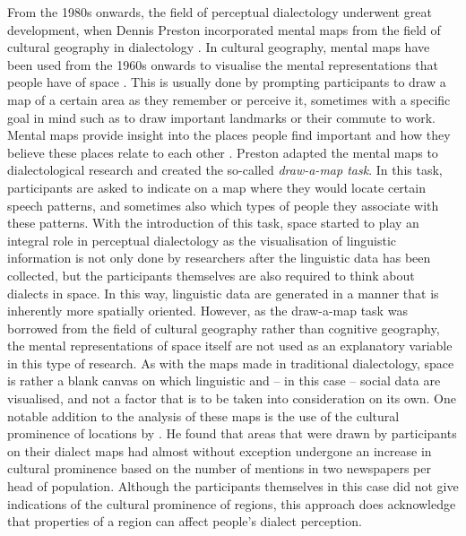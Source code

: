 \documentclass[output=paper,colorlinks,citecolor=brown,draft]{langscibook}
\begin{document}
From the 1980s onwards, the field of perceptual dialectology underwent great development, when Dennis Preston incorporated mental maps from the field of cultural geography in dialectology \citep{montgomery_perceptual_2011, preston_perceptual_1981}. In cultural geography, mental maps have been used from the 1960s onwards to visualise the mental representations that people have of space \citep{lynch_image_1964, portugali_history_2018}. This is usually done by prompting participants to draw a map of a certain area as they remember or perceive it, sometimes with a specific goal in mind such as to draw important landmarks or their commute to work. Mental maps provide insight into the places people find important and how they believe these places relate to each other \citep{gould_mental_1974}. Preston adapted the mental maps to dialectological research and created the so-called \textit{draw-a-map task}. In this task, participants are asked to indicate on a map where they would locate certain speech patterns, and sometimes also which types of people they associate with these patterns. With the introduction of this task, space started to play an integral role in perceptual dialectology as the visualisation of linguistic information is not only done by researchers after the linguistic data has been collected, but the participants themselves are also required to think about dialects in space. In this way, linguistic data are generated in a manner that is inherently more spatially oriented. However, as the draw-a-map task was borrowed from the field of cultural geography rather than cognitive geography, the mental representations of space itself are not used as an explanatory variable in this type of research. As with the maps made in traditional dialectology, space is rather a blank canvas on which linguistic and -- in this case -- social data are visualised, and not a factor that is to be taken into consideration on its own. One notable addition to the analysis of these maps is the use of the cultural prominence of locations by \citet{montgomery_effect_2012}. He found that areas that were drawn by participants on their dialect maps had almost without exception undergone an increase in cultural prominence based on the number of mentions in two newspapers per head of population. Although the participants themselves in this case did not give indications of the cultural prominence of regions, this approach does acknowledge that properties of a region can affect people's dialect perception. 
\end{document}

